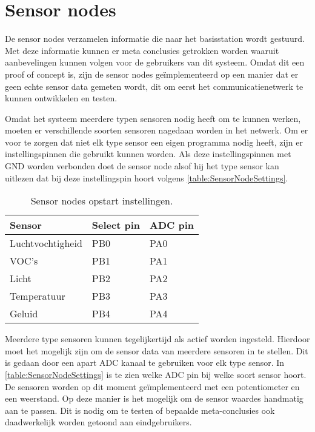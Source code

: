 \section{Sensor nodes} \label{sec:dummyData}

De sensor nodes verzamelen informatie die naar het basisstation wordt gestuurd. Met deze informatie kunnen er meta conclusies getrokken worden waaruit aanbevelingen kunnen volgen voor de gebruikers van dit systeem. Omdat dit een proof of concept is, zijn de sensor nodes geïmplementeerd op een manier dat er geen echte sensor data gemeten wordt, dit om eerst het communicatienetwerk te kunnen ontwikkelen en testen. 

Omdat het systeem meerdere typen sensoren nodig heeft om te kunnen werken, moeten er verschillende soorten sensoren nagedaan worden in het netwerk. Om er voor te zorgen dat niet elk type sensor een eigen programma nodig heeft, zijn er instellingspinnen die gebruikt kunnen worden.
Als deze instellingspinnen met GND worden verbonden doet de sensor node alsof hij het type sensor kan uitlezen dat bij deze instellingspin hoort volgens \autoref{table:SensorNodeSettings}.
\begin{table}[h]
    \centering
    \begin{tabular}{l|l|l}      
        \textbf{Sensor}     & \textbf{Select pin}   & \textbf{ADC pin}  \\\hline
        Luchtvochtigheid    & PB0                   & PA0               \\\hline
        VOC's               & PB1                   & PA1               \\\hline
        Licht                & PB2                   & PA2               \\\hline
        Temperatuur         & PB3                   & PA3               \\\hline
        Geluid              & PB4                   & PA4
    \end{tabular}
    \caption{Sensor nodes opstart instellingen.}
    \label{table:SensorNodeSettings}
\end{table}
Meerdere type sensoren kunnen tegelijkertijd als actief worden ingesteld. Hierdoor moet het mogelijk zijn om de sensor data van meerdere sensoren in te stellen. Dit is gedaan door een apart ADC kanaal te gebruiken voor elk type sensor. In \autoref{table:SensorNodeSettings} is te zien welke ADC pin bij welke soort sensor hoort. De sensoren worden op dit moment geïmplementeerd met een potentiometer en een weerstand. Op deze manier is het mogelijk om de sensor waardes handmatig aan te passen. Dit is nodig om te testen of bepaalde meta-conclusies ook daadwerkelijk worden getoond aan eindgebruikers.

